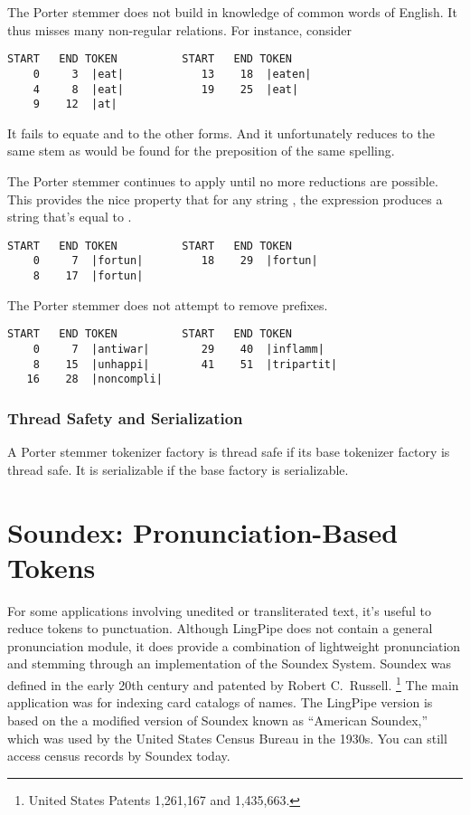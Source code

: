 The Porter stemmer does not build in knowledge of common words of
English.  It thus misses many non-regular relations.  For instance,
consider
%
\begin{verbatim}
START   END TOKEN          START   END TOKEN
    0     3  |eat|            13    18  |eaten|
    4     8  |eat|            19    25  |eat|
    9    12  |at|
\end{verbatim}
%
It fails to equate  and  to
the other forms.  And it unfortunately reduces  to
the same stem as would be found for the preposition of the same
spelling.

The Porter stemmer continues to apply until no more reductions are
possible.  This provides the nice property that for any string
, the expression  produces a string that's
equal to . 
%
\begin{verbatim}
START   END TOKEN          START   END TOKEN
    0     7  |fortun|         18    29  |fortun|
    8    17  |fortun|         
\end{verbatim}
%

The Porter stemmer does not attempt to remove prefixes.
%
\begin{verbatim}
START   END TOKEN          START   END TOKEN
    0     7  |antiwar|        29    40  |inflamm|
    8    15  |unhappi|        41    51  |tripartit|
   16    28  |noncompli|
\end{verbatim}


\subsubsection{Thread Safety and Serialization}

A Porter stemmer tokenizer factory is thread safe if its base
tokenizer factory is thread safe.  It is serializable if the base
factory is serializable.


\section{Soundex: Pronunciation-Based Tokens}

For some applications involving unedited or transliterated text, it's
useful to reduce tokens to punctuation.  Although LingPipe does not
contain a general pronunciation module, it does provide a combination
of lightweight pronunciation and stemming through an implementation of
the Soundex System.  Soundex was defined in the early 20th century and
patented by Robert C.~Russell.
%
\footnote{United States Patents 1,261,167 and 1,435,663.}
%
The main application was for indexing card catalogs of names.
The LingPipe version is based on the a modified version of
Soundex known as ``American Soundex,'' which was used by the
United States Census Bureau in the 1930s.  You can still access
census records by Soundex today.

